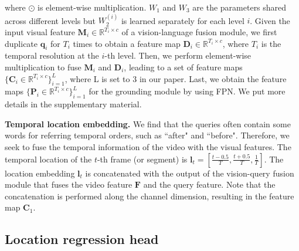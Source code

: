 \documentclass[10pt,twocolumn,letterpaper]{article}
\def\Vec#1{{\boldsymbol{#1}}}
\begin{document}
	where $\odot$ is element-wise multiplication. $W_1$ and $W_3$ are the parameters shared across different levels but $W_2^{(i)}$ is learned separately for each level $i$. Given the input visual feature $\mathbf{M}_i \in \mathbb{R}^{T_i \times c}$ of a vision-language fusion module, we first duplicate $\Vec{q}_i$ for $T_{i}$ times to obtain a feature map $\mathbf{D}_i \in \mathbb{R}^{T_i \times c}$, where $T_{i}$ is the temporal resolution at the $i$-th level. Then, we perform element-wise multiplication to fuse $\mathbf{M}_i$ and $\mathbf{D}_i$, leading to a set of feature maps $\{\mathbf{C}_i \in \mathbb{R}^{T_i \times c}\}_{i=1}^{L}$, where L is set to 3 in our paper. Last, we obtain the feature maps $\{\mathbf{P}_i \in \mathbb{R}^{T_i \times c}\}_{i=1}^{L}$ for the grounding module by using FPN. We put more details in the supplementary material.

	


	\noindent \textbf{Temporal location embedding.} We find that the queries often contain some words for referring temporal orders, such as ``after" and ``before". Therefore, we seek to fuse the temporal information of the video with the visual features.
	The temporal location of the $t$-th frame (or segment) is $\Vec{l}_t = [\frac{t-0.5}{T}, \frac{t+0.5}{T}, \frac{1}{T}]$. The location embedding $\Vec{l}_t$ is concatenated with the output of the vision-query fusion module that fuses the video feature $\mathbf{F}$ and the query feature. Note that the concatenation is performed along the channel dimension, resulting in the feature map $\mathbf{C}_1$. 







	


	\subsection{Location regression head}
	\label{sec:regression-head}
	
\end{document}
